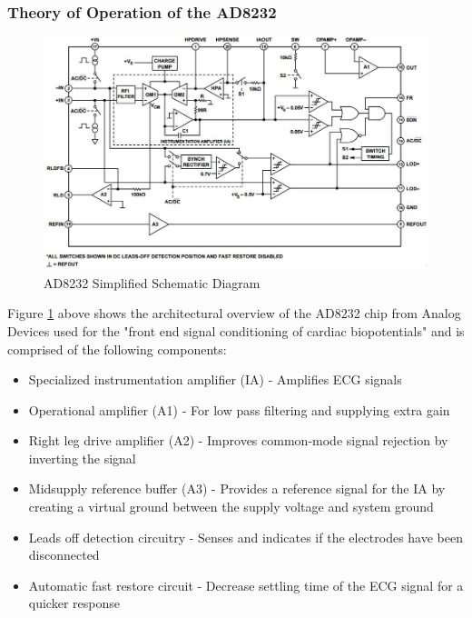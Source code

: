 \subsubsection*{Theory of Operation of the AD8232}

\begin{figure}[H]
	\centering
	\includegraphics[width=\linewidth]{ad8232schematic.jpg}
	\caption{AD8232 Simplified Schematic Diagram \cite{ad8232datasheet}}
	\label{ad8232schematic}
\end{figure}

Figure \ref{ad8232schematic} above shows the architectural overview of the AD8232 chip from Analog Devices used for the "front end signal conditioning of cardiac biopotentials" \cite{ad8232datasheet} and is comprised of the following components: 

\begin{itemize}
	\item Specialized instrumentation amplifier (IA) - Amplifies ECG signals 
	\item Operational amplifier (A1) - For low pass filtering and supplying extra gain 
	\item Right leg drive amplifier (A2) - Improves common-mode signal rejection by inverting the signal 
	\item Midsupply reference buffer (A3) - Provides a reference signal for the IA by creating a virtual ground between the supply voltage and system ground 
	\item Leads off detection circuitry - Senses and indicates if the electrodes have been disconnected
	\item Automatic fast restore circuit - Decrease settling time of the ECG signal for a quicker response 
\end{itemize} 

